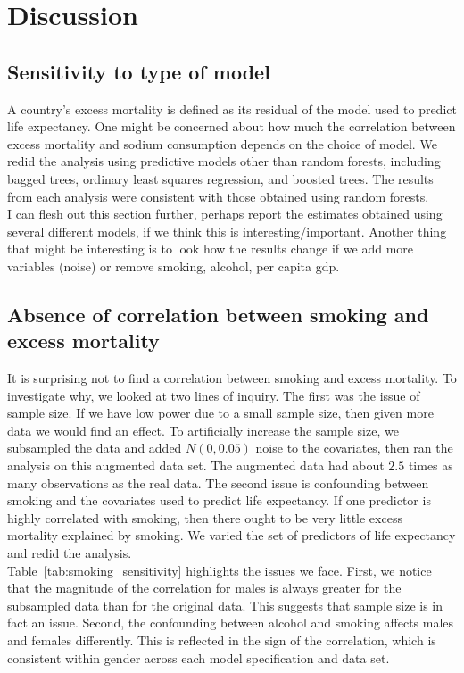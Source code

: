 \documentclass{article}
\begin{document}
\clearpage
\section{Discussion}
\subsection{Sensitivity to type of model}
A country's excess mortality is defined as its residual of the model used to predict life expectancy.  One might be concerned about how much the correlation between excess mortality and sodium consumption depends on the choice of model.  We redid the analysis using predictive models other than random forests, including bagged trees, ordinary least squares regression, and boosted trees.  The results from each analysis were consistent with those obtained using random forests. \\

I can flesh out this section further, perhaps report the estimates obtained using several different models, if we think this is interesting/important.  Another thing that might be interesting is to look how the results change if we add more variables (noise) or remove smoking, alcohol, per capita gdp.

\subsection{Absence of correlation between smoking and excess mortality}
It is surprising not to find a correlation between smoking and excess mortality.  To investigate why, we looked at two lines of inquiry.  The first was the issue of sample size.  If we have low power due to a small sample size, then given more data we would find an effect.  To artificially increase the sample size, we subsampled the data and added $N(0, 0.05)$ noise to the covariates, then ran the analysis on this augmented data set.  The augmented data had about $2.5$ times as many observations as the real data. The second issue is confounding between smoking and the covariates used to predict life expectancy.  If one predictor is highly correlated with smoking, then there ought to be very little excess mortality explained by smoking.  We varied the set of predictors of life expectancy and redid the analysis.  \\

Table~\ref{tab:smoking_sensitivity} highlights the issues we face.  First, we notice that the magnitude of the correlation for males is always greater for the subsampled data than for the original data.  This suggests that sample size is in fact an issue.  Second, the confounding between alcohol and smoking affects males and females differently.  This is reflected in the sign of the correlation, which is consistent within gender across each model specification and data set.  \\
\end{document}
